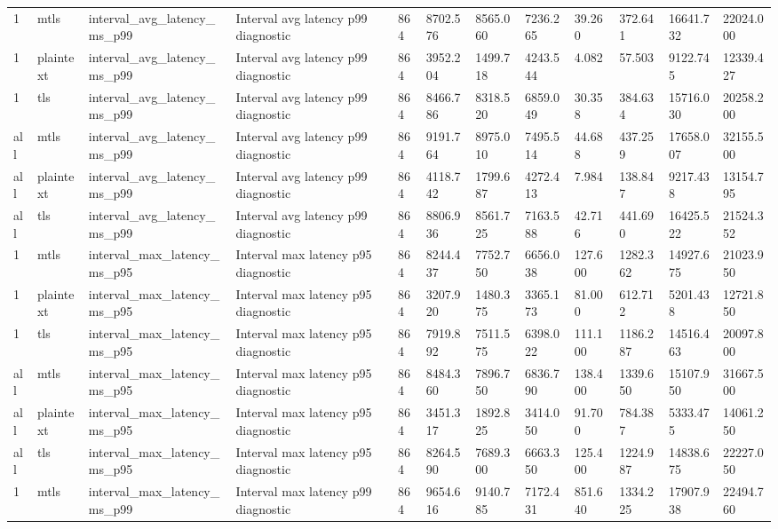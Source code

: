\begin{longtable}{llllllllllll}
1 & mtls & interval\_avg\_latency\_ms\_p99 & Interval avg latency p99 diagnostic & 864 & 8702.576 & 8565.060 & 7236.265 & 39.260 & 372.641 & 16641.732 & 22024.000 \\
1 & plaintext & interval\_avg\_latency\_ms\_p99 & Interval avg latency p99 diagnostic & 864 & 3952.204 & 1499.718 & 4243.544 & 4.082 & 57.503 & 9122.745 & 12339.427 \\
1 & tls & interval\_avg\_latency\_ms\_p99 & Interval avg latency p99 diagnostic & 864 & 8466.786 & 8318.520 & 6859.049 & 30.358 & 384.634 & 15716.030 & 20258.200 \\
all & mtls & interval\_avg\_latency\_ms\_p99 & Interval avg latency p99 diagnostic & 864 & 9191.764 & 8975.010 & 7495.514 & 44.688 & 437.259 & 17658.007 & 32155.500 \\
all & plaintext & interval\_avg\_latency\_ms\_p99 & Interval avg latency p99 diagnostic & 864 & 4118.742 & 1799.687 & 4272.413 & 7.984 & 138.847 & 9217.438 & 13154.795 \\
all & tls & interval\_avg\_latency\_ms\_p99 & Interval avg latency p99 diagnostic & 864 & 8806.936 & 8561.725 & 7163.588 & 42.716 & 441.690 & 16425.522 & 21524.352 \\
1 & mtls & interval\_max\_latency\_ms\_p95 & Interval max latency p95 diagnostic & 864 & 8244.437 & 7752.750 & 6656.038 & 127.600 & 1282.362 & 14927.675 & 21023.950 \\
1 & plaintext & interval\_max\_latency\_ms\_p95 & Interval max latency p95 diagnostic & 864 & 3207.920 & 1480.375 & 3365.173 & 81.000 & 612.712 & 5201.438 & 12721.850 \\
1 & tls & interval\_max\_latency\_ms\_p95 & Interval max latency p95 diagnostic & 864 & 7919.892 & 7511.575 & 6398.022 & 111.100 & 1186.287 & 14516.463 & 20097.800 \\
all & mtls & interval\_max\_latency\_ms\_p95 & Interval max latency p95 diagnostic & 864 & 8484.360 & 7896.750 & 6836.790 & 138.400 & 1339.650 & 15107.950 & 31667.500 \\
all & plaintext & interval\_max\_latency\_ms\_p95 & Interval max latency p95 diagnostic & 864 & 3451.317 & 1892.825 & 3414.050 & 91.700 & 784.387 & 5333.475 & 14061.250 \\
all & tls & interval\_max\_latency\_ms\_p95 & Interval max latency p95 diagnostic & 864 & 8264.590 & 7689.300 & 6663.350 & 125.400 & 1224.987 & 14838.675 & 22227.050 \\
1 & mtls & interval\_max\_latency\_ms\_p99 & Interval max latency p99 diagnostic & 864 & 9654.616 & 9140.785 & 7172.431 & 851.640 & 1334.225 & 17907.938 & 22494.760 \\

\end{longtable}
